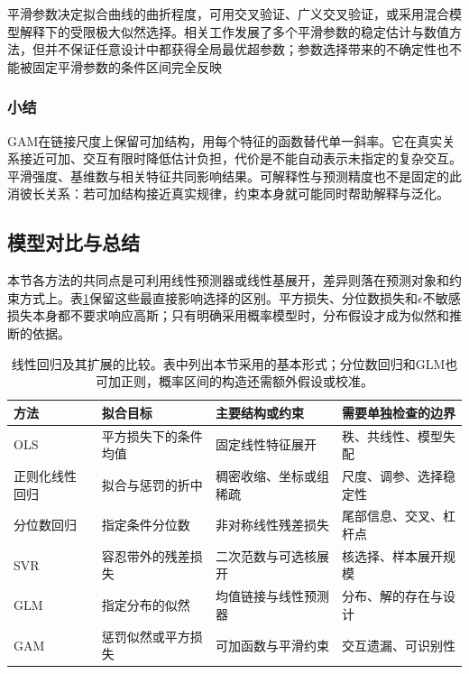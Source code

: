 平滑参数决定拟合曲线的曲折程度，可用交叉验证、广义交叉验证，或采用混合模型解释下的受限极大似然选择。相关工作发展了多个平滑参数的稳定估计与数值方法，但并不保证任意设计中都获得全局最优超参数；参数选择带来的不确定性也不能被固定平滑参数的条件区间完全反映

\subsubsection{小结}

GAM在链接尺度上保留可加结构，用每个特征的函数替代单一斜率。它在真实关系接近可加、交互有限时降低估计负担，代价是不能自动表示未指定的复杂交互。平滑强度、基维数与相关特征共同影响结果。可解释性与预测精度也不是固定的此消彼长关系：若可加结构接近真实规律，约束本身就可能同时帮助解释与泛化。

\subsection{模型对比与总结}
\label{sec:regression-linear-summary}

本节各方法的共同点是可利用线性预测器或线性基展开，差异则落在预测对象和约束方式上。表\ref{tab:regression-linear-comparison}保留这些最直接影响选择的区别。平方损失、分位数损失和$\epsilon$不敏感损失本身都不要求响应高斯；只有明确采用概率模型时，分布假设才成为似然和推断的依据。

\begin{table}[htbp]
  \centering
  \begin{tabularx}{\linewidth}{@{}lXXX@{}}
    \toprule
    方法 & 拟合目标 & 主要结构或约束 & 需要单独检查的边界\\
    \midrule
    OLS & 平方损失下的条件均值 & 固定线性特征展开 & 秩、共线性、模型失配\\
    正则化线性回归 & 拟合与惩罚的折中 & 稠密收缩、坐标或组稀疏 & 尺度、调参、选择稳定性\\
    分位数回归 & 指定条件分位数 & 非对称线性残差损失 & 尾部信息、交叉、杠杆点\\
    SVR & 容忍带外的残差损失 & 二次范数与可选核展开 & 核选择、样本展开规模\\
    GLM & 指定分布的似然 & 均值链接与线性预测器 & 分布、解的存在与设计\\
    GAM & 惩罚似然或平方损失 & 可加函数与平滑约束 & 交互遗漏、可识别性\\
    \bottomrule
  \end{tabularx}
  \caption{线性回归及其扩展的比较。表中列出本节采用的基本形式；分位数回归和GLM也可加正则，概率区间的构造还需额外假设或校准。}
  \label{tab:regression-linear-comparison}
\end{table}

